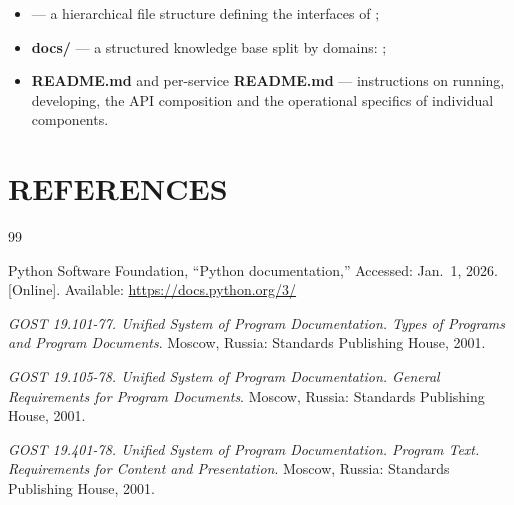 \documentclass[12pt,a4paper]{extarticle}
\begin{document}
\begin{hseExample}
\begin{itemize}[leftmargin=1.25cm]
    \item \textbf{} --- a hierarchical file structure defining the interfaces of ;
    \item \textbf{docs/} --- a structured knowledge base split by domains: ;
    \item \textbf{README.md} and per-service \textbf{README.md} --- instructions on running, developing, the API composition and the operational specifics of individual components.
\end{itemize}
\end{hseExample}

\clearpage
\pagestyle{appendix}

\section*{REFERENCES}

\renewcommand{\refname}{}
\begin{thebibliography}{99}
\vspace{-1cm}

Python Software Foundation, \enquote{Python documentation,} Accessed: Jan.~1, 2026. [Online]. Available: \url{https://docs.python.org/3/}

\emph{GOST 19.101-77. Unified System of Program Documentation. Types of Programs and Program Documents}. Moscow, Russia: Standards Publishing House, 2001.

\emph{GOST 19.105-78. Unified System of Program Documentation. General Requirements for Program Documents}. Moscow, Russia: Standards Publishing House, 2001.

\emph{GOST 19.401-78. Unified System of Program Documentation. Program Text. Requirements for Content and Presentation}. Moscow, Russia: Standards Publishing House, 2001.

\end{thebibliography}



\clearpage


\end{document}
